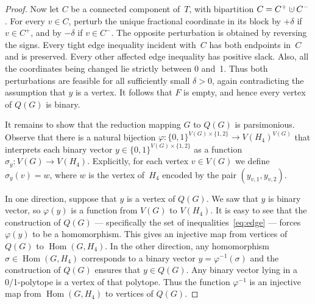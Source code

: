 \documentclass[11pt, oneside]{article}   	%
\def\Hom{\mathop{\mathrm{Hom}}}
\newcommand{\cupdot}{\mathbin{\mathaccent\cdot\cup}}
\let\phi=\varphi
\def\Hfour{H_4}
\begin{document}
\begin{proof}
Now let $C$ be a connected component of~$T$, with bipartition $C=C^+\cupdot C^-$.  For every $v\in C$, perturb the unique fractional coordinate in its block by $+\delta$ if $v\in C^+$, and by $-\delta$ if $v\in C^-$.  The opposite perturbation is obtained by reversing the signs.  Every tight edge inequality incident with~$C$ has both endpoints in~$C$ and is preserved.  Every other affected edge inequality has positive slack.  Also, all the coordinates being changed lie strictly between 0 and~1.  Thus both perturbations are feasible for all sufficiently small $\delta>0$, again contradicting the assumption that $y$ is a vertex.  It follows that $F$ is empty, and hence every vertex of $Q(G)$ is binary.

It remains to show that the reduction mapping $G$ to $Q(G)$ is parsimonious.  Observe that there is a natural bijection $\phi:\{0,1\}^{V(G)\times\{1,2\}}\to V(\Hfour)^{V(G)}$ that interprets each binary vector $y\in\{0,1\}^{V(G)\times\{1,2\}}$ as a function $\sigma_y:V(G)\to V(\Hfour)$.  Explicitly, for each vertex $v\in V(G)$ we define $\sigma_y(v)=w$, where $w$ is the vertex of~$\Hfour$ encoded by the pair $(y_{v,1},y_{v,2})$.

In one direction, suppose that $y$ is a vertex of $Q(G)$.  We saw that $y$ is binary vector, so $\phi(y)$ is a function from $V(G)$ to $V(\Hfour)$.  It is easy to see that the construction of $Q(G)$ --- specifically the set of inequalities~\eqref{eq:edge} --- forces $\phi(y)$ to be a homomorphism.  This gives an injective map from vertices of $Q(G)$ to $\Hom(G,\Hfour)$.  In the other direction, any homomorphism  $\sigma\in\Hom(G,\Hfour)$ corresponds to a binary vector $y=\phi^{-1}(\sigma)$ and the construction of $Q(G)$ ensures that $y\in Q(G)$.  Any binary vector lying in a 0/1-polytope is a vertex of that polytope.  Thus the function $\phi^{-1}$ is an injective map from $\Hom(G,\Hfour)$ to vertices of $Q(G)$.
\end{proof}  
\end{document}
